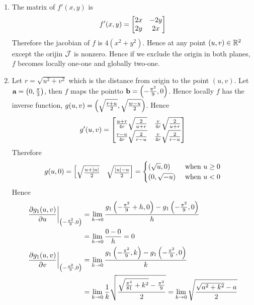 \documentclass[a4paper, 11pt]{article}
\begin{document}
{\begin{enumerate}[label=(\alph*)]
		\item The matrix of $f'(x,y)$ is \[ f'(x,y) =\left[ \begin{matrix}
					      2x & -2y \\ 2y & 2x
				      \end{matrix}\right] \] Therefore the jacobian of $f$ is $4(x^2+y^2)$. Hence at any point $(u,v)\in \mathbb{R}^2$ except the orijin $\mathcal{J}$ is nonzero. Hence if we exclude the origin in both planes, $f$ becomes locally one-one and globally two-one.
		\item Let $r=\sqrt{u^2+v^2}$ which is the distance from origin to the point $(u,v)$. Let $\textbf{a}=\left(0,\frac{\pi}{3}\right)$, then $f$ maps the pointto  $\textbf{b}=\left(-\frac{\pi^2}{9},0\right)$. Hence locally $f$ has the inverse function, $g(u,v)=\left(\sqrt{\frac{r+u}{2}},\sqrt{\frac{w-u}{2}} \right)$. Hence $$ g'(u,v)=\left[ \begin{matrix}
					      \frac{u+r}{4r}\sqrt{\frac{2}{u+r}} & \frac{v}{4r}\sqrt{\frac{2}{u+r}} \\
					      \frac{r-u}{4r}\sqrt{\frac{2}{r-u}} & \frac{v}{4r}\sqrt{\frac{2}{r-u}}
				      \end{matrix}\right]$$  Therefore $$g(u,0)=\left[ \begin{matrix}
					      \sqrt{\frac{u+|u|}{2}} & \sqrt{\frac{|u|-u}{2}} \end{matrix}\right]=\begin{cases}
				      (\sqrt{u},0) & \text{ when } u\geq 0\\ (0,\sqrt{-u}) & \text{ when }u<0\end{cases}$$Hence
		      \begin{align*}
			      \lt.\del{g_1(u,v)}{u}\rt|_{\lt( -\frac{\pi^2}{9}, 0\rt)} & =\lim_{h\to 0}\frac{g_1\lt(-\frac{\pi^2}{9}+h,0\rt) - g_1\lt(-\frac{\pi^2}{9},0\rt)}{h}                                                                                \\
			                                                               & = \lim_{h\to 0}\frac{0-0}{h}=0                                                                                                                                         \\
			      \lt.\del{g_1(u,v)}{v}\rt|_{\lt( -\frac{\pi^2}{9}, 0\rt)} & =\lim_{k\to 0 } \frac{g_1\lt(-\frac{\pi^2}{9},k\rt) - g_1\lt(-\frac{\pi^2}{9},0\rt)}{k}                                                                                \\
			                                                               & = \lim_{k\to 0}\frac1k \sqrt{\frac{\sqrt{\frac{\pi^4}{81}+k^2}-\frac{\pi^2}{9}}{2}} =\lim_{k\to 0}\sqrt{ \frac{\sqrt{a^2+k^2}-a}{2}}                                   \\

\end{align*}
\end{enumerate}}
\end{document}
